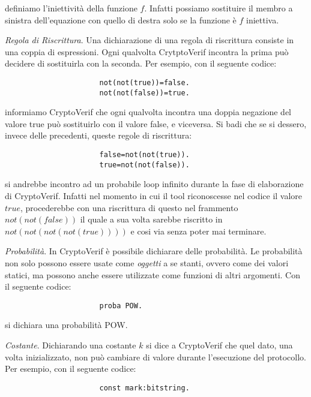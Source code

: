 \documentclass[a4paper,openright,twoside,12pt]{report}
\begin{document}
\begin{description}
		    definiamo l'iniettivit\`a della funzione $f$. Infatti possiamo sostituire il membro a sinistra dell'equazione con quello di destra solo se la funzione \`e $f$ iniettiva.
 \item{\emph{Regola di Riscrittura}.} Una dichiarazione di una regola di riscrittura consiste in una coppia di espressioni. Ogni qualvolta CrytptoVerif incontra la prima
			      pu\`o decidere di sostituirla con la seconda. Per esempio, con il seguente codice:
 

      				      \begin{verbatim}
				      not(not(true))=false.
				      not(not(false))=true.
				      \end{verbatim}
 
informiamo CryptoVerif che ogni qualvolta incontra una doppia negazione del valore true pu\`o sostituirlo con il valore false, e viceversa. 
Si badi che se si dessero, invece delle precedenti, queste regole di riscrittura:
 

				      \begin{verbatim}
				      false=not(not(true)).
				      true=not(not(false)).
				      \end{verbatim}
 
si andrebbe incontro ad un probabile loop infinito durante la fase di elaborazione di CryptoVerif. Infatti nel momento in cui il tool riconoscesse nel codice il valore $true$, 
procederebbe con una riscrittura di questo nel frammento $not(not(false))$ il quale a sua volta sarebbe riscritto in $not(not(not(not(true))))$ e cosi via senza poter mai terminare.
 \item{\emph{Probabilit\`a}.} In CryptoVerif \`e possibile dichiarare delle probabilit\`a. Le probabilit\`a non solo possono essere usate come \emph{oggetti} 
		      a se stanti, ovvero come dei valori statici, ma possono anche essere utilizzate come funzioni di altri argomenti. Con il seguente codice:

				      \begin{verbatim}
				      proba POW.
				      \end{verbatim}
 
si dichiara una probabilit\`a POW. 
 \item{\emph{Costante}.} Dichiarando una costante $k$ si dice a CryptoVerif che quel dato, una volta inizializzato, non pu\`o cambiare di valore durante l'esecuzione del protocollo. Per esempio, con il seguente codice:
 

				      \begin{verbatim}
				      const mark:bitstring.
				      \end{verbatim}
 

\end{description}
\end{document}

